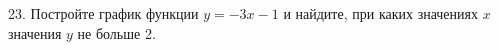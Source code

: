 23. Постройте график функции $y=-3x-1$ и найдите, при каких значениях $x$ значения $y$ не больше 2.\\
